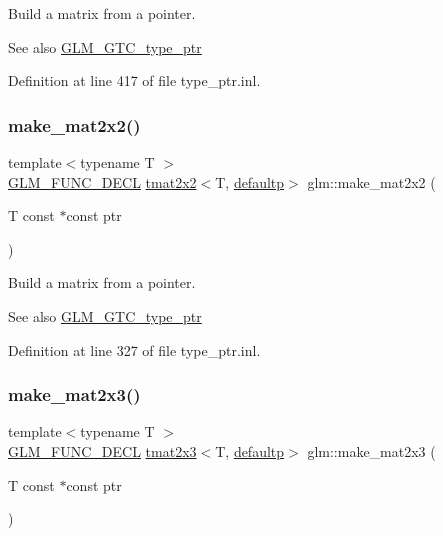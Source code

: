 Build a matrix from a pointer. \begin{DoxySeeAlso}{See also}
\mbox{\hyperlink{group__gtc__type__ptr}{G\+L\+M\+\_\+\+G\+T\+C\+\_\+type\+\_\+ptr}} 
\end{DoxySeeAlso}


Definition at line 417 of file type\+\_\+ptr.\+inl.

\mbox{\label{group__gtc__type__ptr_gadb29e510762e1042069cb28bf24ae990}} 
\subsubsection{\texorpdfstring{make\_mat2x2()}{make\_mat2x2()}}
{\footnotesize\ttfamily template$<$typename T $>$ \\
\mbox{\hyperlink{setup_8hpp_ab2d052de21a70539923e9bcbf6e83a51}{G\+L\+M\+\_\+\+F\+U\+N\+C\+\_\+\+D\+E\+CL}} \mbox{\hyperlink{structglm_1_1tmat2x2}{tmat2x2}}$<$T, \mbox{\hyperlink{namespaceglm_a0f04f086094c747d227af4425893f545a9d21ccd8b5a009ec7eb7677befc3bf51}{defaultp}}$>$ glm\+::make\+\_\+mat2x2 (\begin{DoxyParamCaption}\item[{T const $\ast$const}]{ptr }\end{DoxyParamCaption})}

Build a matrix from a pointer. \begin{DoxySeeAlso}{See also}
\mbox{\hyperlink{group__gtc__type__ptr}{G\+L\+M\+\_\+\+G\+T\+C\+\_\+type\+\_\+ptr}} 
\end{DoxySeeAlso}


Definition at line 327 of file type\+\_\+ptr.\+inl.

\mbox{\label{group__gtc__type__ptr_ga37988c6dd941f617cdfab86d54375fc1}} 
\subsubsection{\texorpdfstring{make\_mat2x3()}{make\_mat2x3()}}
{\footnotesize\ttfamily template$<$typename T $>$ \\
\mbox{\hyperlink{setup_8hpp_ab2d052de21a70539923e9bcbf6e83a51}{G\+L\+M\+\_\+\+F\+U\+N\+C\+\_\+\+D\+E\+CL}} \mbox{\hyperlink{structglm_1_1tmat2x3}{tmat2x3}}$<$T, \mbox{\hyperlink{namespaceglm_a0f04f086094c747d227af4425893f545a9d21ccd8b5a009ec7eb7677befc3bf51}{defaultp}}$>$ glm\+::make\+\_\+mat2x3 (\begin{DoxyParamCaption}\item[{T const $\ast$const}]{ptr }\end{DoxyParamCaption})}

